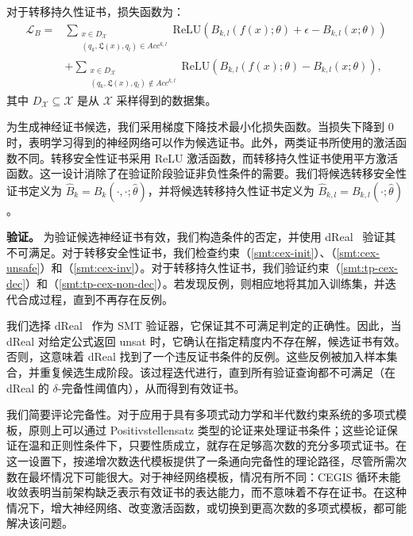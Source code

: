 对于转移持久性证书，损失函数为：
\begin{align}
\mathcal{L}_B = &\sum_{\substack{x \in D_{\mathcal{X}} \\ (q_k, \mathfrak{L}(x), q_l) \in Acc^{k,l}}} \text{ReLU}(B_{k,l}(f(x); \theta) + \epsilon - B_{k,l}(x; \theta)) \\
&+ \sum_{\substack{x \in D_{\mathcal{X}} \\ (q_k, \mathfrak{L}(x), q_l) \not\in Acc^{k,l}}} \text{ReLU}(B_{k,l}(f(x); \theta) - B_{k,l}(x; \theta)),
\end{align}
其中 $D_{\mathcal{X}} \subseteq \mathcal{X}$ 是从 $\mathcal{X}$ 采样得到的数据集。

为生成神经证书候选，我们采用梯度下降技术最小化损失函数。当损失下降到 0 时，表明学习得到的神经网络可以作为候选证书。此外，两类证书所使用的激活函数不同。转移安全性证书采用 ReLU 激活函数，而转移持久性证书使用平方激活函数。这一设计消除了在验证阶段验证非负性条件的需要。我们将候选转移安全性证书定义为 $\hat{B}_{k} = B_{k}(\cdot, \cdot; \hat{\theta})$，并将候选转移持久性证书定义为 $\hat{B}_{k,l} = B_{k,l}(\cdot; \hat{\theta})$。

\textbf{验证。} 为验证候选神经证书有效，我们构造条件的否定，并使用 dReal~\cite{gao2013dreal} 验证其不可满足。对于转移安全性证书，我们检查约束（\ref{smt:cex-init}）、（\ref{smt:cex-unsafe}）和（\ref{smt:cex-inv}）。对于转移持久性证书，我们验证约束（\ref{smt:tp-cex-dec}）和（\ref{smt:tp-cex-non-dec}）。若发现反例，则相应地将其加入训练集，并迭代合成过程，直到不再存在反例。

我们选择 dReal~\cite{gao2013dreal} 作为 SMT 验证器，它保证其不可满足判定的正确性。因此，当 dReal 对给定公式返回 unsat 时，它确认在指定精度内不存在解，候选证书有效。否则，这意味着 dReal 找到了一个违反证书条件的反例。这些反例被加入样本集合，并重复候选生成阶段。该过程迭代进行，直到所有验证查询都不可满足（在 dReal 的 $\delta$-完备性阈值内），从而得到有效证书。

我们简要评论完备性。对于应用于具有多项式动力学和半代数约束系统的多项式模板，原则上可以通过 Positivstellensatz 类型的论证来处理证书条件；这些论证保证在温和正则性条件下，只要性质成立，就存在足够高次数的充分多项式证书。在这一设置下，按递增次数迭代模板提供了一条通向完备性的理论路径，尽管所需次数在最坏情况下可能很大。对于神经网络模板，情况有所不同：CEGIS 循环未能收敛表明当前架构缺乏表示有效证书的表达能力，而不意味着不存在证书。在这种情况下，增大神经网络、改变激活函数，或切换到更高次数的多项式模板，都可能解决该问题。

